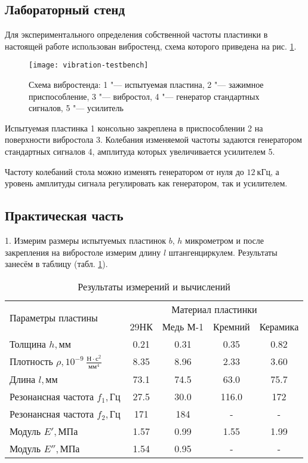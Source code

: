 \subsection{Лабораторный стенд}
Для экспериментального определения собственной частоты пластинки в настоящей работе использован вибростенд, схема которого приведена на рис. \ref{fig:vibration-testbench}.

\begin{figure}[!ht]
    \centering
    \texttt{[image: vibration-testbench]}
    \caption{Схема вибростенда: 1 "--- испытуемая пластина, 2 "--- зажимное приспособление, 3 "--- вибростол, 4 "--- генератор стандартных сигналов, 5 "--- усилитель}
    \label{fig:vibration-testbench}
\end{figure}

Испытуемая пластинка 1 консольно закреплена в приспособлении 2 на поверхности вибростола 3.
Колебания изменяемой частоты задаются генератором стандартных сигналов 4, амплитуда которых увеличивается усилителем 5.

Частоту колебаний стола можно изменять генератором от нуля до $12 ~кГц$, а уровень амплитуды сигнала регулировать как генератором, так и усилителем.

\subsection{Практическая часть}
1. Измерим размеры испытуемых пластинок $b$, $h$ микрометром и после закрепления на вибростоле измерим длину $l$ штангенциркулем.
Результаты занесём в таблицу (табл. \ref{tab:results}).

\begin{table}[H]
    \centering
    \caption{Результаты измерений и вычислений}
    \label{tab:results}
    \begin{tabular}{|l|c|c|c|c|}
        \hline
        \multirow{2}{*}{Параметры пластины}               & \multicolumn{4}{c|}{Материал пластинки} \\ \cline{2-5}
                                                          & 29НК & Медь М-1 & Кремний & Керамика \\ \hline
        Толщина $h, мм$                                   & 0.21 & 0.31 & 0.35  & 0.82 \\ \hline
        Плотность $\rho, 10^{-9}~\frac{Н \cdot с^2}{мм^4} $ & 8.35 & 8.96 & 2.33  & 3.60 \\ \hline
        Длина $l, мм$                                     & 73.1 & 74.5 & 63.0  & 75.7 \\ \hline
        Резонансная частота $f_1, Гц$                     & 27.5 & 30.0 & 116.0 & 172  \\ \hline
        Резонансная частота $f_2, Гц$                     & 171  & 184  & -     & -    \\ \hline
        Модуль $E', МПа$                                  & 1.57 & 0.99 & 1.55  & 1.99 \\ \hline
        Модуль $E'', МПа$                                 & 1.54 & 0.95 & -     & -    \\ \hline
    \end{tabular}
\end{table}

